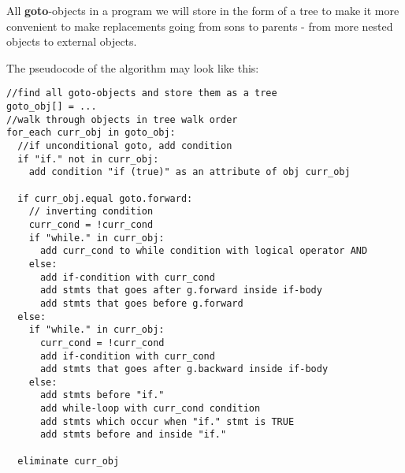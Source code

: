 \documentclass[two column]{article}
\begin{document}
All \textbf{goto}-objects in a program we will store in the form of a tree to make it more convenient to make replacements going from sons to parents - from more nested objects to external objects.

The pseudocode of the algorithm may look like this:

\begin{lstlisting}
//find all goto-objects and store them as a tree
goto_obj[] = ...
//walk through objects in tree walk order
for_each curr_obj in goto_obj:
  //if unconditional goto, add condition
  if "if." not in curr_obj:
    add condition "if (true)" as an attribute of obj curr_obj
    
  if curr_obj.equal goto.forward:
    // inverting condition
    curr_cond = !curr_cond
    if "while." in curr_obj:
      add curr_cond to while condition with logical operator AND
    else:
      add if-condition with curr_cond
      add stmts that goes after g.forward inside if-body
      add stmts that goes before g.forward
  else:
    if "while." in curr_obj:
      curr_cond = !curr_cond
      add if-condition with curr_cond
      add stmts that goes after g.backward inside if-body
    else:
      add stmts before "if."
      add while-loop with curr_cond condition
      add stmts which occur when "if." stmt is TRUE
      add stmts before and inside "if."
      
  eliminate curr_obj
\end{lstlisting}
\end{document}
